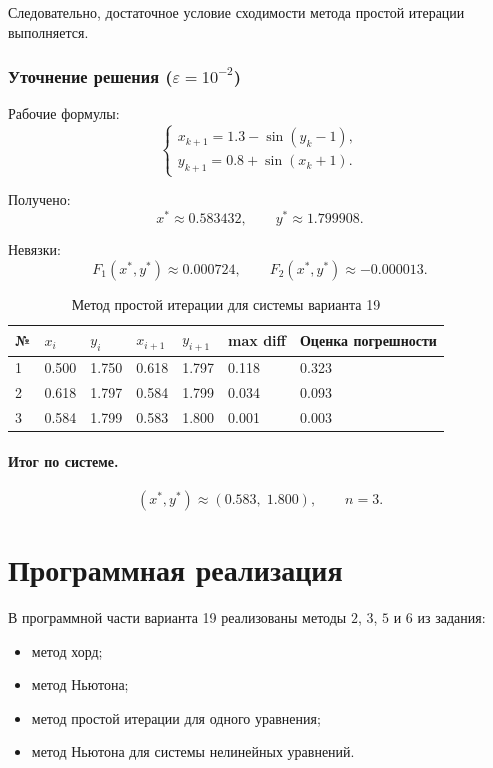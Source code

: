 \documentclass[12pt,a4paper]{article}
\begin{document}
Следовательно, достаточное условие сходимости метода простой итерации выполняется.

\subsubsection[Уточнение решения (eps = 10\textasciicircum -2)]{Уточнение решения ($\varepsilon = 10^{-2}$)}

Рабочие формулы:
\[
\begin{cases}
x_{k+1} = 1.3 - \sin(y_k - 1),\\
y_{k+1} = 0.8 + \sin(x_k + 1).
\end{cases}
\]

Получено:
\[
x^* \approx 0.583432,\qquad y^* \approx 1.799908.
\]

Невязки:
\[
F_1(x^*,y^*) \approx 0.000724,\qquad F_2(x^*,y^*) \approx -0.000013.
\]

\begin{table}[H]
  \centering
  \caption{Метод простой итерации для системы варианта 19}
  \begin{tabular}{C{10mm}C{18mm}C{18mm}C{18mm}C{18mm}C{22mm}C{28mm}}
    \toprule
    № & $x_i$ & $y_i$ & $x_{i+1}$ & $y_{i+1}$ & max diff & Оценка погрешности \\
     & 0.500 & 1.750 & 0.618 & 1.797 & 0.118 & 0.323 \\
    2 & 0.618 & 1.797 & 0.584 & 1.799 & 0.034 & 0.093 \\
    3 & 0.584 & 1.799 & 0.583 & 1.800 & 0.001 & 0.003 \\
    \bottomrule
  \end{tabular}
\end{table}

\paragraph{Итог по системе.}
\[
(x^*, y^*) \approx (0.583,\;1.800), \qquad n = 3.
\]

\clearpage
\section{Программная реализация}

В программной части варианта 19 реализованы методы $2$, $3$, $5$ и $6$ из задания:
\begin{itemize}[leftmargin=1.2cm]
  \item метод хорд;
  \item метод Ньютона;
  \item метод простой итерации для одного уравнения;
  \item метод Ньютона для системы нелинейных уравнений.
\end{itemize}
\end{document}
